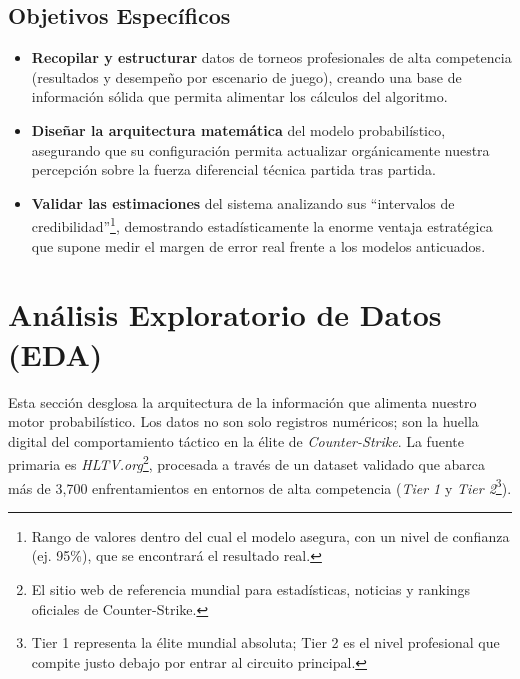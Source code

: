 \documentclass[twocolumn,10pt]{article}
\begin{document}
\subsection{Objetivos Específicos}

\begin{itemize}[noitemsep]
    \item \textbf{Recopilar y estructurar} datos de torneos profesionales de alta competencia (resultados y desempeño por escenario de juego), creando una base de información sólida que permita alimentar los cálculos del algoritmo.
    \item \textbf{Diseñar la arquitectura matemática} del modelo probabilístico, asegurando que su configuración permita actualizar orgánicamente nuestra percepción sobre la fuerza diferencial técnica partida tras partida.
    \item \textbf{Validar las estimaciones} del sistema analizando sus ``intervalos de credibilidad''\footnote{Rango de valores dentro del cual el modelo asegura, con un nivel de confianza (ej. 95\%), que se encontrará el resultado real.}, demostrando estadísticamente la enorme ventaja estratégica que supone medir el margen de error real frente a los modelos anticuados.
\end{itemize}

\section{Análisis Exploratorio de Datos (EDA)}
Esta sección desglosa la arquitectura de la información que alimenta nuestro motor probabilístico. Los datos no son solo registros numéricos; son la huella digital del comportamiento táctico en la élite de \textit{Counter-Strike}. La fuente primaria es \textit{HLTV.org}\footnote{El sitio web de referencia mundial para estadísticas, noticias y rankings oficiales de Counter-Strike.}, procesada a través de un dataset validado \citep{csgodataset2020} que abarca más de 3,700 enfrentamientos en entornos de alta competencia (\textit{Tier 1} y \textit{Tier 2}\footnote{Tier 1 representa la élite mundial absoluta; Tier 2 es el nivel profesional que compite justo debajo por entrar al circuito principal.}).
\end{document}
